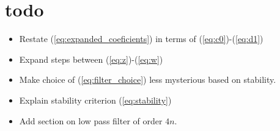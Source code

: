 \documentclass[a4paper]{article}
\begin{document}
\section{todo}
\begin{itemize}
\item Restate (\ref{eq:expanded_coeficients}) in terms of (\ref{eq:c0})-(\ref{eq:d1})
\item Expand steps between (\ref{eq:z})-(\ref{eq:w})
\item Make choice of (\ref{eq:filter_choice}) less mysterious based on stability.
\item Explain stability criterion (\ref{eq:stability})
\item Add section on low pass filter of order $4n$.
\end{itemize}
\end{document}
